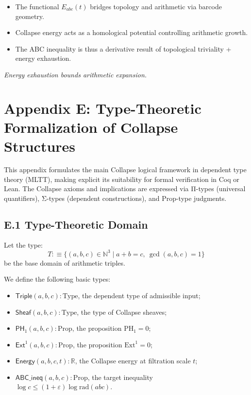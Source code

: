 \documentclass[11pt]{article}
\begin{document}
\begin{itemize}
  \item The functional \( E_{abc}(t) \) bridges topology and arithmetic via barcode geometry.
  \item Collapse energy acts as a homological potential controlling arithmetic growth.
  \item The ABC inequality is thus a derivative result of topological triviality + energy exhaustion.
\end{itemize}

\begin{center}
    \textit{Energy exhaustion bounds arithmetic expansion.}
\end{center}



\section*{Appendix E: Type-Theoretic Formalization of Collapse Structures}

This appendix formulates the main Collapse logical framework in dependent type theory (MLTT),  
making explicit its suitability for formal verification in Coq or Lean. The Collapse axioms and implications  
are expressed via Π-types (universal quantifiers), Σ-types (dependent constructions), and Prop-type judgments.

\subsection*{E.1 Type-Theoretic Domain}

Let the type:
\[
T :\equiv \{ (a,b,c) \in \mathbb{N}^3 \mid a + b = c,\ \gcd(a,b,c)=1 \}
\]
be the base domain of arithmetic triples.

We define the following basic types:
\begin{itemize}
  \item \( \mathsf{Triple}(a,b,c) : \mathrm{Type} \), the dependent type of admissible input;
  \item \( \mathsf{Sheaf}(a,b,c) : \mathrm{Type} \), the type of Collapse sheaves;
  \item \( \mathsf{PH}_1(a,b,c) : \mathrm{Prop} \), the proposition \( \mathrm{PH}_1 = 0 \);
  \item \( \mathsf{Ext}^1(a,b,c) : \mathrm{Prop} \), the proposition \( \mathrm{Ext}^1 = 0 \);
  \item \( \mathsf{Energy}(a,b,c,t) : \mathbb{R} \), the Collapse energy at filtration scale \( t \);
  \item \( \mathsf{ABC\_ineq}(a,b,c) : \mathrm{Prop} \), the target inequality \( \log c \leq (1+\varepsilon) \log \mathrm{rad}(abc) \).
\end{itemize}
\end{document}
